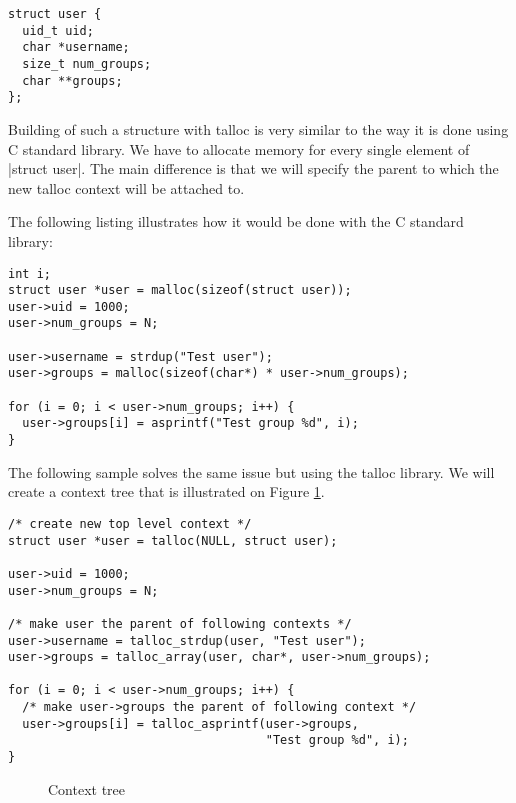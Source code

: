 \begin{lstlisting}[caption={struct user},label={struct-user}]
struct user {
  uid_t uid;
  char *username;
  size_t num_groups;
  char **groups;
};
\end{lstlisting}

Building of such a structure with talloc is very similar to the way it is done
using C standard library. We have to allocate memory for every single element of
|struct user|. The main difference is that we will specify the parent to which
the new talloc context will be attached to.

The following listing illustrates how it would be done with the C standard
library:

\begin{lstlisting}[caption={Building struct user -- C standard library}]
int i;
struct user *user = malloc(sizeof(struct user));
user->uid = 1000;
user->num_groups = N;

user->username = strdup("Test user");
user->groups = malloc(sizeof(char*) * user->num_groups);

for (i = 0; i < user->num_groups; i++) {
  user->groups[i] = asprintf("Test group %d", i);
}
\end{lstlisting}

\noindent
The following sample solves the same issue but using the talloc library. We will
create a context tree that is illustrated on Figure
\ref{fig:context-tree-1-user}.

\begin{lstlisting}[caption={Building struct user -- talloc library},
label={lst:context-tree-user},
morekeywords={talloc,talloc_strdup,talloc_array,talloc_asprintf}]
/* create new top level context */
struct user *user = talloc(NULL, struct user);

user->uid = 1000;
user->num_groups = N;

/* make user the parent of following contexts */
user->username = talloc_strdup(user, "Test user");
user->groups = talloc_array(user, char*, user->num_groups);

for (i = 0; i < user->num_groups; i++) {
  /* make user->groups the parent of following context */
  user->groups[i] = talloc_asprintf(user->groups,
                                    "Test group %d", i);
}
\end{lstlisting}

\begin{figure}[H]
  \centering
  
  \caption{Context tree}
  \label{fig:context-tree-1-user}
\end{figure}

